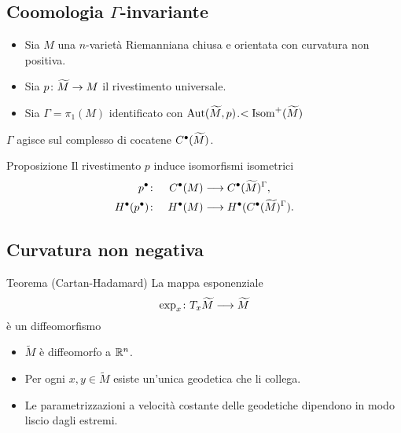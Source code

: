 \documentclass{beamer}
\begin{document}
\subsection{Coomologia $\Gamma$-invariante}
\begin{frame}{\secname}{\subsecname}
\begin{itemize}
\item Sia $M$ una $n$-varietà Riemanniana chiusa e orientata con curvatura non positiva.
\item Sia $\map{p}{\widetilde M}{M}$ il rivestimento universale.
\item Sia $\Gamma=\pi_1(M)$ identificato con $\operatorname{Aut}(\widetilde M,p)$.{\color{gray}$<\operatorname{Isom}^+(\widetilde M)$}
\end{itemize}

$\Gamma$ agisce sul complesso di cocatene $C^\bullet(\widetilde M)$.
\begin{block}{Proposizione}
Il rivestimento $p$ induce isomorfismi isometrici
\begin{alignat*}{2}
p^\bullet\colon&&C^\bullet(M)&\longrightarrow C^\bullet(\widetilde M)^\Gamma,\\
H^\bullet(p^\bullet)\colon&&H^\bullet(M)&\longrightarrow H^\bullet(C^\bullet(\widetilde M)^\Gamma).
\end{alignat*}
\end{block}
\end{frame}
\subsection{Curvatura non negativa}
\begin{frame}{\secname}{\subsecname}
\begin{block}{Teorema (Cartan-Hadamard)}
La mappa esponenziale
\[
\map{\exp_x}{T_x\widetilde M}{\widetilde M}
\]
è un diffeomorfismo
\end{block}
\begin{itemize}
\item $\widetilde M$ è diffeomorfo a $\mathbb{R}^n$.
\item Per ogni $x,y\in\widetilde M$ esiste un'unica geodetica che li collega.
\item Le parametrizzazioni a velocità costante delle geodetiche dipendono in modo liscio dagli estremi.
\end{itemize}
\end{frame}
\end{document}
